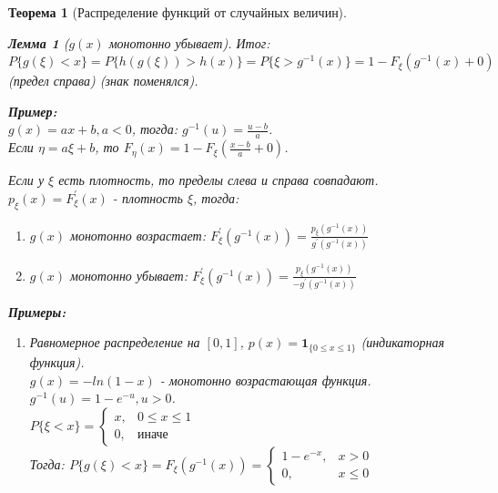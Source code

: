 \documentclass[14pt]{extarticle}
\theoremstyle{breakstyle}
\newtheorem{theorem}{Теорема}[subsection]
\newtheorem{lemma}{Лемма}[subsection]
\begin{document}
\begin{theorem}[Распределение функций от случайных величин]
\begin{lemma}[$g(x)$ монотонно убывает]
\vspace{\baselineskip}

Итог: $P\{g(\xi) < x\} = P\{h(g(\xi)) > h(x)\} = P\{\xi > g^{-1}(x)\} = 1 - F_{\xi}(g^{-1}(x) + 0)$ (предел справа) (знак поменялся).\\

\vspace{\baselineskip}

\textbf{Пример:}\\
$g(x) = ax+b, a<0$, тогда: $g^{-1}(u) = \frac{u - b}{a}$.\\
Если $\eta = a\xi + b$, то $F_{\eta}(x) = 1 - F_{\xi}(\frac{x-b}{a} + 0)$.

\vspace{\baselineskip}

Если у $\xi$ есть плотность, то пределы слева и справа совпадают.\\
$p_{\xi}(x) = F_{\xi}^{'}(x)$ - плотность $\xi$, тогда:
\begin{enumerate}
    \item $g(x)$ монотонно возрастает: $F_{\xi}^{'}(g^{-1}(x)) = \frac{p_{\xi}(g^{-1}(x))}{g^{'}(g^{-1}(x))}$
    \item $g(x)$ монотонно убывает: $F_{\xi}^{'}(g^{-1}(x)) = \frac{p_{\xi}(g^{-1}(x))}{-g^{'}(g^{-1}(x))}$
\end{enumerate}

\end{lemma}

\vspace{\baselineskip}

\textbf{Примеры:}
\begin{enumerate}
    \item Равномерное распределение на $[0, 1]$, $p(x) = \mathbf{1}_{\{0 \leq x \leq 1\}}$ (индикаторная функция).\\
          $g(x) = -ln(1 - x)$ - монотонно возрастающая функция.\\
          $g^{-1}(u) = 1 - e^{-u}, u > 0$.\\ 
          $P\{\xi < x\} = \begin{cases} 
                       x, & 0 \leq x \leq 1 \\
                       0, & \text{иначе}
          \end{cases}$\\
          Тогда: $P\{g(\xi) < x\} = F_{\xi}(g^{-1}(x)) = \begin{cases} 
                                                      1 - e^{-x}, & x > 0 \\
                                                      0, & x \leq 0
          \end{cases}$


\end{enumerate}
\end{theorem}
\end{document}
